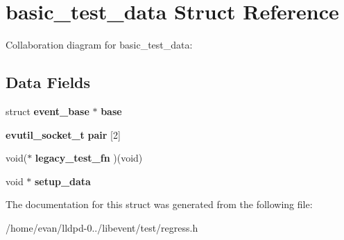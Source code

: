 \section{basic\-\_\-test\-\_\-data \-Struct \-Reference}
\label{structbasic__test__data}


\-Collaboration diagram for basic\-\_\-test\-\_\-data\-:
\subsection*{\-Data \-Fields}
\begin{DoxyCompactItemize}
\item 
struct {\bf event\-\_\-base} $\ast$ {\bfseries base}\label{structbasic__test__data_ab1a154f7530a81e9dd1d63fc6b98a5c7}

\item 
{\bf evutil\-\_\-socket\-\_\-t} {\bfseries pair} [2]\label{structbasic__test__data_a7ef47aef7d24990fb5569359054b92cf}

\item 
void($\ast$ {\bfseries legacy\-\_\-test\-\_\-fn} )(void)\label{structbasic__test__data_aa8bce26532c0de3fa175ca978371e4ac}

\item 
void $\ast$ {\bfseries setup\-\_\-data}\label{structbasic__test__data_a8582fb63aecd1164735afff1366a6c3c}

\end{DoxyCompactItemize}


\-The documentation for this struct was generated from the following file\-:\begin{DoxyCompactItemize}
\item 
/home/evan/lldpd-\/0../libevent/test/regress.\-h\end{DoxyCompactItemize}
